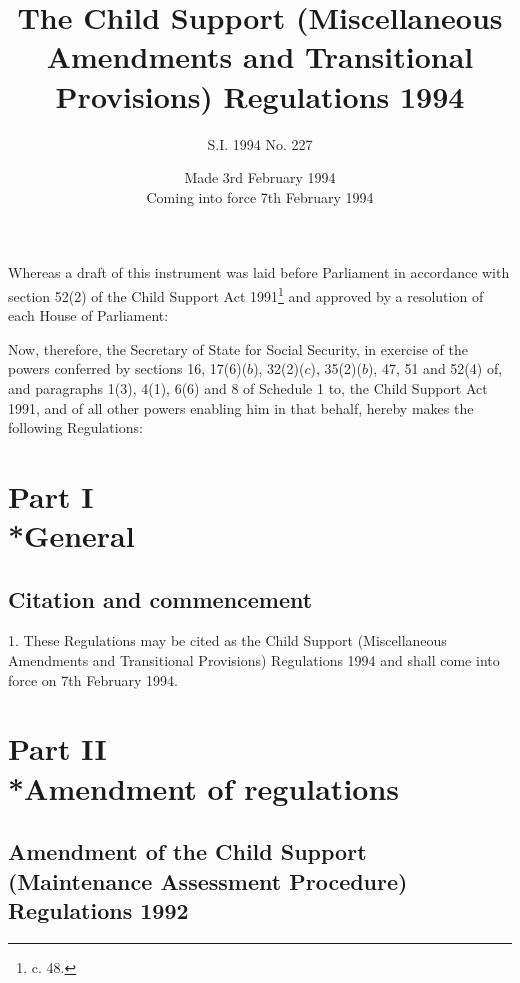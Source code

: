 \documentclass[a4paper]{article}
\title{The Child Support (Miscellaneous Amendments and Transitional Provisions) Regulations 1994}
\author{S.I. 1994 No. 227}
\date{Made 3rd February 1994\\Coming into force 7th February 1994}
\newcommand{\parthead}{}
\begin{document}
\maketitle

\noindent
Whereas a draft of this instrument was laid before Parliament in accordance with section 52(2) of the Child Support Act 1991\footnote{ c. 48.} and approved by a resolution of each House of Parliament:

Now, therefore, the Secretary of State for Social Security, in exercise of the powers conferred by sections 16, 17(6)($b$), 32(2)($c$), 35(2)($b$), 47, 51 and 52(4) of, and paragraphs 1(3), 4(1), 6(6) and 8 of Schedule 1 to, the Child Support Act 1991, and of all other powers enabling him in that behalf, hereby makes the following Regulations:

{\sloppy

\tableofcontents

}

\setcounter{secnumdepth}{-2}

\section[Part I --- General]{Part I\\*General}

\renewcommand\parthead{--- Part I}

\subsection[1. Citation and commencement]{Citation and commencement}

1.  These Regulations may be cited as the Child Support (Miscellaneous Amendments and Transitional Provisions) Regulations 1994 and shall come into force on 7th February 1994.

\section[Part II --- Amendment of regulations]{Part II\\*Amendment of regulations}

\renewcommand\parthead{--- Part II}

\subsection[2. Amendment of the Child Support (Maintenance Assessment Procedure) Regulations 1992]{\sloppy Amendment of the Child Support (Maintenance Assessment Procedure) Regulations 1992}
\end{document}
